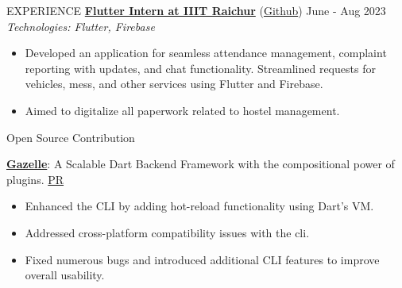 \documentclass{resume} %
\begin{document}
\begin{rSection}{EXPERIENCE}
\textbf{\href{https://drive.google.com/file/d/16NqRxg5LFhZu0WkdqG3z83XnLyf5P2UO/view?usp=sharing}{Flutter Intern at IIIT Raichur}} (\href{https://github.com/ShivanshuKGupta/hustle_stay}{Github}) \hfill June - Aug 2023\\
\textit{Technologies: Flutter, Firebase}
 \begin{itemize}
    \itemsep -3pt {} 
    \item Developed an application for seamless attendance management, complaint reporting with updates, and chat functionality. Streamlined requests for vehicles, mess, and other services using Flutter and Firebase.
    \item Aimed to digitalize all paperwork related to hostel management.
 \end{itemize}

\end{rSection}


\begin{rSection}{Open Source Contribution}

\textbf{\href{https://docs.gazelle-dart.dev/}{Gazelle}}: A Scalable Dart Backend Framework with the compositional power of plugins. \hfill \href{https://github.com/intales/gazelle/commits?author=ShivanshuKGupta}{PR}
    \begin{itemize}
        \item Enhanced the CLI by adding hot-reload functionality using Dart’s VM.
        \item Addressed cross-platform compatibility issues with the cli.
        \item Fixed numerous bugs and introduced additional CLI features to improve overall usability.
    \end{itemize}

\end{rSection}

\end{document}
